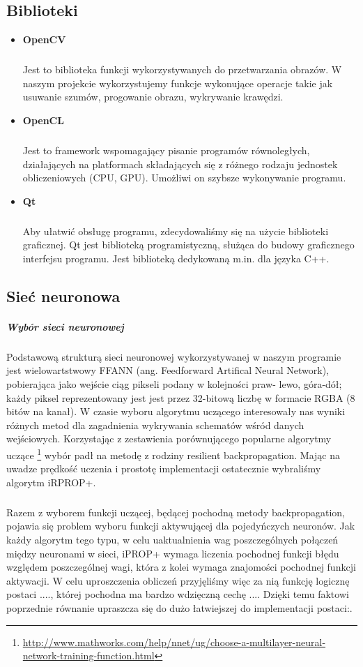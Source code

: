 \documentclass{article}
\begin{document}
\subsection{Biblioteki}
\begin{itemize}
\item \textbf{OpenCV}
\subparagraph{} Jest to biblioteka funkcji wykorzystywanych do przetwarzania obrazów. W naszym projekcie wykorzystujemy funkcje wykonujące operacje takie jak usuwanie szumów, progowanie obrazu, wykrywanie krawędzi.

\item \textbf{OpenCL}
\subparagraph{} Jest to framework wspomagający pisanie programów równoległych, działających na platformach składających się z różnego rodzaju jednostek obliczeniowych (CPU, GPU). Umożliwi on szybsze wykonywanie programu.

\item \textbf{Qt}
\subparagraph{} Aby ułatwić obsługę programu, zdecydowaliśmy się na użycie biblioteki graficznej.  Qt jest biblioteką programistyczną, służąca do budowy graficznego interfejsu programu. Jest biblioteką dedykowaną m.in. dla języka C++. 

\end{itemize}

\subsection{Sieć neuronowa}
\subparagraph{Wybór sieci neuronowej} Podstawową strukturą sieci neuronowej wykorzystywanej w naszym programie jest wielowartstwowy FFANN (ang. Feedforward Artifical Neural Network), pobierająca jako wejście ciąg pikseli podany w kolejności praw- lewo, góra-dół; każdy piksel reprezentowany jest jest przez 32-bitową liczbę w formacie RGBA (8 bitów na kanał).
W czasie wyboru algorytmu uczącego interesowały nas wyniki różnych metod dla zagadnienia wykrywania schematów wśród danych wejściowych. Korzystając z zestawienia porównującego popularne algorytmy uczące \footnote{\scriptsize \url{http://www.mathworks.com/help/nnet/ug/choose-a-multilayer-neural-network-training-function.html}} wybór padł na metodę z rodziny resilient backpropagation. Mając na uwadze prędkość uczenia i prostotę implementacji ostatecznie wybraliśmy algorytm iRPROP+.

\subparagraph{} Razem z wyborem funkcji uczącej, będącej pochodną metody backpropagation, pojawia się problem wyboru funkcji aktywującej dla pojedyńczych neuronów. Jak każdy algorytm tego typu, w celu uaktualnienia wag poszczególnych połączeń między neuronami w sieci, iPROP+ wymaga liczenia pochodnej funkcji błędu względem poszczególnej wagi, która z kolei wymaga znajomości pochodnej funkcji aktywacji. W celu uproszczenia obliczeń przyjęliśmy więc za nią funkcję logicznę postaci ...., której pochodna ma bardzo wdzięczną cechę .... Dzięki temu faktowi poprzednie równanie upraszcza się do dużo łatwiejszej do implementacji postaci:. 
\end{document}
